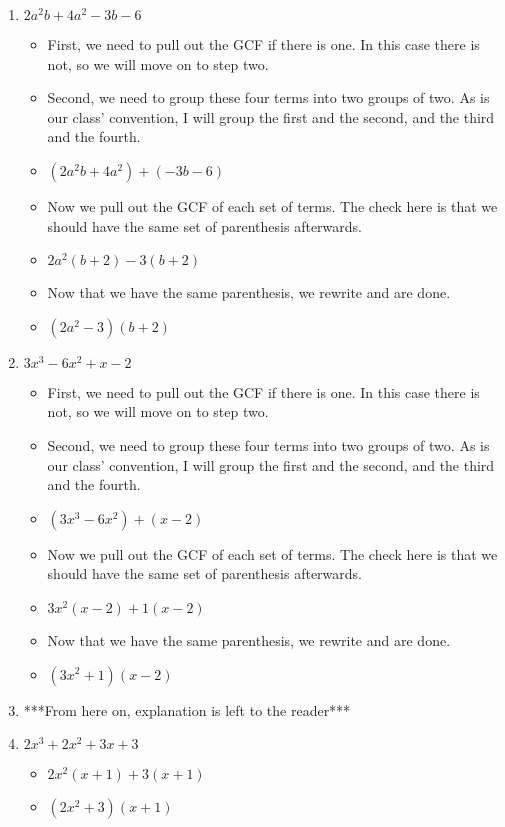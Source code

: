 \begin{enumerate}
\begin{itemize}
  \end{itemize}
\item $2a^{2}b + 4a^{2} - 3b - 6$
  \begin{itemize}
  \item First, we need to pull out the GCF if there is one. In this case there is not, so we will move on to step two.
  \item Second, we need to group these four terms into two groups of two. As is our class' convention, I will group the first and the second, and the third and the fourth.
  \item [] $(2a^{2}b+4a^{2}) +(-3b-6)$
  \item Now we pull out the GCF of each set of terms. The check here is that we should have the same set of parenthesis afterwards.
  \item [] $2a^{2}(b+2)-3(b+2)$
  \item Now that we have the same parenthesis, we rewrite and are done.
  \item [] $(2a^{2}-3)(b+2)$
  \end{itemize}
\item $3x^{3} - 6x^{2} + x - 2$
  \begin{itemize}
  \item First, we need to pull out the GCF if there is one. In this case there is not, so we will move on to step two.
  \item Second, we need to group these four terms into two groups of two. As is our class' convention, I will group the first and the second, and the third and the fourth.
  \item [] $(3x^{3}-6x^{2}) +(x-2)$
  \item Now we pull out the GCF of each set of terms. The check here is that we should have the same set of parenthesis afterwards.
  \item [] $3x^{2}(x-2)+1(x-2)$
  \item Now that we have the same parenthesis, we rewrite and are done.
  \item [] $(3x^{2}+1)(x-2)$
  \end{itemize}
\item [] ***From here on, explanation is left to the reader***
\item $2x^{3} + 2x^{2} + 3x + 3$
  \begin{itemize}
  \item $2x^{2}(x+1)+3(x+1)$
  \item $(2x^{2}+3)(x+1)$
  \end{itemize}

\end{enumerate}
